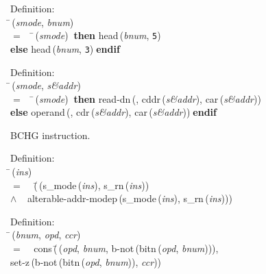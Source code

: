 \begin{tabbing}{\sc Definition}: \\  
\=\,({\it{smode\/}}, {\it{bnum\/}}) \\ 
$=$$\;\;\;\;$\=\,({\it{smode\/}})$\;\;${\bf then }{\rm{head}}\,({\it{bnum\/}}, {\tt{5}}) \\ 
{\bf else }{\rm{head}}\,({\it{bnum\/}}, {\tt{3}})$\;${\bf  endif}\-\-
\end{tabbing}

\begin{tabbing}{\sc Definition}: \\  
\=\,({\it{smode\/}}, {\it{s\&addr\/}}) \\ 
$=$$\;\;\;\;$\=\,({\it{smode\/}})$\;\;${\bf then }{\rm{read-dn}}\,({}, {\rm{cddr}}\,({\it{s\&addr\/}}), {\rm{car}}\,({\it{s\&addr\/}})) \\ 
{\bf else }{\rm{operand}}\,({}, {\rm{cdr}}\,({\it{s\&addr\/}}), {\rm{car}}\,({\it{s\&addr\/}}))$\;${\bf  endif}\-\-
\end{tabbing}

 BCHG instruction.
\begin{tabbing}{\sc Definition}: \\  
\=\,({\it{ins\/}}) \\ 
$=$$\;\;\;\;$(\=\,({\rm{s\_mode}}\,({\it{ins\/}}), {\rm{s\_rn}}\,({\it{ins\/}})) \\ 
$\wedge$$\;\;\;\;${\rm{alterable-addr-modep}}\,({\rm{s\_mode}}\,({\it{ins\/}}), {\rm{s\_rn}}\,({\it{ins\/}})))\-\-
\end{tabbing}

\begin{tabbing}{\sc Definition}: \\  
\=\,({\it{bnum\/}}, {\it{opd\/}}, {\it{ccr\/}}) \\ 
$=$$\;\;\;\;${\rm{cons}}\,(\=\,({\it{opd\/}}, {\it{bnum\/}}, {\rm{b-not}}\,({\rm{bitn}}\,({\it{opd\/}}, {\it{bnum\/}}))), \\ 
{\rm{set-z}}\,({\rm{b-not}}\,({\rm{bitn}}\,({\it{opd\/}}, {\it{bnum\/}})), {\it{ccr\/}}))\-\-
\end{tabbing}

